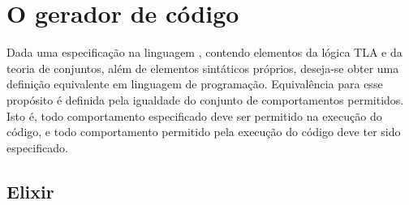 \chapter{O gerador de código}
\label{cap3}

Dada uma especificação na linguagem \TLAA, contendo elementos da lógica TLA e da teoria de conjuntos, além de elementos sintáticos próprios, deseja-se obter uma definição equivalente em linguagem de programação. Equivalência para esse propósito é definida pela igualdade do conjunto de comportamentos permitidos. Isto é, todo comportamento especificado deve ser permitido na execução do código, e todo comportamento permitido pela execução do código deve ter sido especificado.

\section{Elixir}
\label{elixir}

